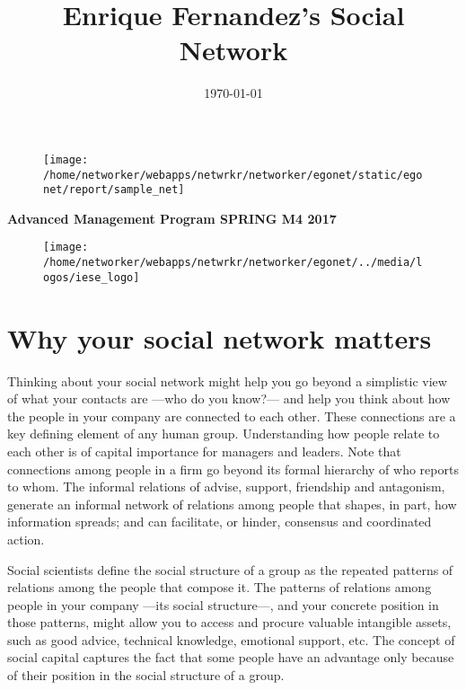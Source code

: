 \documentclass[a4paper,12pt]{article}
\title{\Huge{Enrique Fernandez's Social Network}}
\date{\today}
\begin{document}
\clearpage
\thispagestyle{empty}

\maketitle


\begin{figure}[H]
\centering
\texttt{[image: /home/networker/webapps/netwrkr/networker/egonet/static/egonet/report/sample\_net]}
\end{figure}


\begin{center}
\Large{\textbf{Advanced Management Program SPRING M4 2017}}


\begin{figure}[H]
\centering
\texttt{[image: /home/networker/webapps/netwrkr/networker/egonet/../media/logos/iese\_logo]}
\end{figure}

\small{}
\end{center}

\newpage
\clearpage
{}


\section*{Why your social network matters}


Thinking about your social network might help you go beyond a simplistic view of what your contacts are ---who do you know?--- and help you think about how the people in your company are connected to each other. These connections are a key defining element of any human group. Understanding how people relate to each other is of capital importance for managers and leaders. Note that connections among people in a firm go beyond its formal hierarchy of who reports to whom. The informal relations of advise, support, friendship and antagonism, generate an informal network of relations among people that shapes, in part, how information spreads; and can facilitate, or hinder, consensus and coordinated action.

Social scientists define the social structure of a group as the repeated patterns of relations among the people that compose it. The patterns of relations among people in your company ---its social structure---, and your concrete position in those patterns, might allow you to access and procure valuable intangible assets, such as good advice, technical knowledge, emotional support, etc. The concept of social capital captures the fact that some people have an advantage only because of their position in the social structure of a group.
\end{document}
